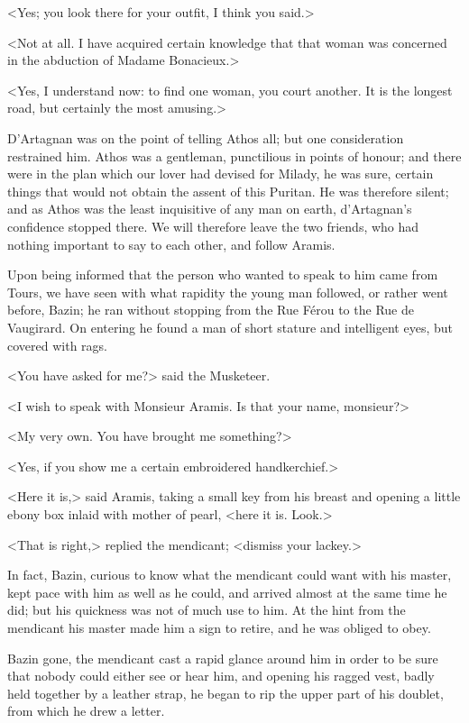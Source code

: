 <Yes; you look there for your outfit, I think you said.> 

<Not at all. I have acquired certain knowledge that that woman was concerned in the abduction of Madame Bonacieux.> 

<Yes, I understand now: to find one woman, you court another. It is the longest road, but certainly the most amusing.> 

D'Artagnan was on the point of telling Athos all; but one consideration restrained him. Athos was a gentleman, punctilious in points of honour; and there were in the plan which our lover had devised for Milady, he was sure, certain things that would not obtain the assent of this Puritan. He was therefore silent; and as Athos was the least inquisitive of any man on earth, d'Artagnan's confidence stopped there. We will therefore leave the two friends, who had nothing important to say to each other, and follow Aramis. 

Upon being informed that the person who wanted to speak to him came from Tours, we have seen with what rapidity the young man followed, or rather went before, Bazin; he ran without stopping from the Rue Férou to the Rue de Vaugirard. On entering he found a man of short stature and intelligent eyes, but covered with rags. 

<You have asked for me?> said the Musketeer. 

<I wish to speak with Monsieur Aramis. Is that your name, monsieur?> 

<My very own. You have brought me something?> 

<Yes, if you show me a certain embroidered handkerchief.> 

<Here it is,> said Aramis, taking a small key from his breast and opening a little ebony box inlaid with mother of pearl, <here it is. Look.> 

<That is right,> replied the mendicant; <dismiss your lackey.> 

In fact, Bazin, curious to know what the mendicant could want with his master, kept pace with him as well as he could, and arrived almost at the same time he did; but his quickness was not of much use to him. At the hint from the mendicant his master made him a sign to retire, and he was obliged to obey. 

Bazin gone, the mendicant cast a rapid glance around him in order to be sure that nobody could either see or hear him, and opening his ragged vest, badly held together by a leather strap, he began to rip the upper part of his doublet, from which he drew a letter. 


